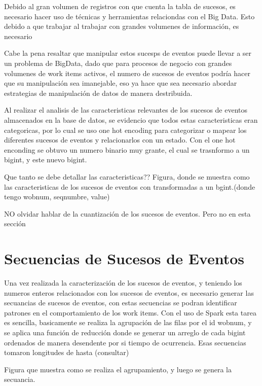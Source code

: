 Debido al gran volumen de registros con que cuenta la tabla de sucesos, es necesario hacer uso de técnicas y herramientas relaciondas con el Big Data. Esto debido a que trabajar al trabajar con grandes volumenes de información, es necesario

Cabe la pena resaltar que manipular estos sucesps de eventos puede llevar a ser un problema de BigData, dado que para procesos de negocio con grandes volumenes de work items activos, el numero de sucesos de eventos podría hacer que su manipulación sea imanejable, eso ya hace que sea necesario abordar estrategias de manipulación de datos de manera destribuida.

Al realizar el analisis de las caracteristicas relevantes de los sucesos de eventos almacenados en la base de datos, se evidencio que todos estas caracteristicas eran categoricas, por lo cual se uso one hot encoding para categorizar o mapear los diferentes sucesos de eventos y relacionarlos con un estado. Con el one hot enconding se obtuvo un numero binario muy grante, el cual se trasnformo a un bigint, y este nuevo bigint.

Que tanto se debe detallar las caracteristicas??
Figura, donde se muestra como las caracteristicas de los sucesos de eventos con transformadas a un bgint.(donde tengo wobnum, seqnumbre, value)


NO olvidar hablar de la cuantización de los sucesos de eventos. Pero no en esta sección


\section{Secuencias de Sucesos de Eventos } %
\label{section2.2}

Una vez realizada la caracterización de los sucesos de eventos, y teniendo los numeros enteros relacionados con los sucesos de eventos, es necesario generar las secuancias de sucesos de eventos, con estas secuencias se podran identificar patrones en el comportamiento de los work items. Con el uso de Spark esta tarea es sencilla, basicamente se realiza la agrupación de las filas por el id wobnum, y se aplica una función de reducción donde se generar un arreglo de cada bigint ordenados de manera desendente por si tiempo de ocurrencia. Esas secuencias tomaron longitudes de hasta (consultar)

Figura que muestra como se realiza el agrupamiento, y luego se genera la secuancia. 


